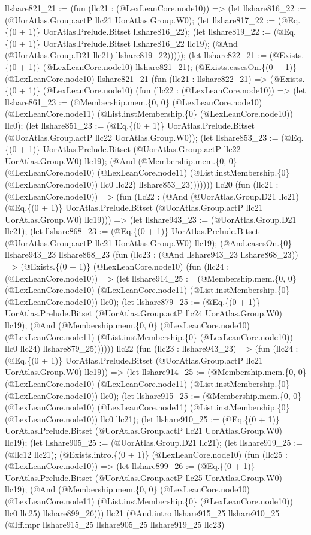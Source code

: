 \documentclass[11pt]{article}
\begin{document}
llshare821\_21 := (fun (llc21 : (@LexLeanCore.node10)) => (let llshare816\_22 := (@UorAtlas.Group.actP llc21 UorAtlas.Group.W0); (let llshare817\_22 := (@Eq.\{(0 + 1)\} UorAtlas.Prelude.Bitset llshare816\_22); (let llshare819\_22 := (@Eq.\{(0 + 1)\} UorAtlas.Prelude.Bitset llshare816\_22 llc19); (@And (@UorAtlas.Group.D21 llc21) llshare819\_22))))); (let llshare822\_21 := (@Exists.\{(0 + 1)\} (@LexLeanCore.node10) llshare821\_21); (@Exists.casesOn.\{(0 + 1)\} (@LexLeanCore.node10) llshare821\_21 (fun (llc21 : llshare822\_21) => (@Exists.\{(0 + 1)\} (@LexLeanCore.node10) (fun (llc22 : (@LexLeanCore.node10)) => (let llshare861\_23 := (@Membership.mem.\{0, 0\} (@LexLeanCore.node10) (@LexLeanCore.node11) (@List.instMembership.\{0\} (@LexLeanCore.node10)) llc0); (let llshare851\_23 := (@Eq.\{(0 + 1)\} UorAtlas.Prelude.Bitset (@UorAtlas.Group.actP llc22 UorAtlas.Group.W0)); (let llshare853\_23 := (@Eq.\{(0 + 1)\} UorAtlas.Prelude.Bitset (@UorAtlas.Group.actP llc22 UorAtlas.Group.W0) llc19); (@And (@Membership.mem.\{0, 0\} (@LexLeanCore.node10) (@LexLeanCore.node11) (@List.instMembership.\{0\} (@LexLeanCore.node10)) llc0 llc22) llshare853\_23))))))) llc20 (fun (llc21 : (@LexLeanCore.node10)) => (fun (llc22 : (@And (@UorAtlas.Group.D21 llc21) (@Eq.\{(0 + 1)\} UorAtlas.Prelude.Bitset (@UorAtlas.Group.actP llc21 UorAtlas.Group.W0) llc19))) => (let llshare943\_23 := (@UorAtlas.Group.D21 llc21); (let llshare868\_23 := (@Eq.\{(0 + 1)\} UorAtlas.Prelude.Bitset (@UorAtlas.Group.actP llc21 UorAtlas.Group.W0) llc19); (@And.casesOn.\{0\} llshare943\_23 llshare868\_23 (fun (llc23 : (@And llshare943\_23 llshare868\_23)) => (@Exists.\{(0 + 1)\} (@LexLeanCore.node10) (fun (llc24 : (@LexLeanCore.node10)) => (let llshare914\_25 := (@Membership.mem.\{0, 0\} (@LexLeanCore.node10) (@LexLeanCore.node11) (@List.instMembership.\{0\} (@LexLeanCore.node10)) llc0); (let llshare879\_25 := (@Eq.\{(0 + 1)\} UorAtlas.Prelude.Bitset (@UorAtlas.Group.actP llc24 UorAtlas.Group.W0) llc19); (@And (@Membership.mem.\{0, 0\} (@LexLeanCore.node10) (@LexLeanCore.node11) (@List.instMembership.\{0\} (@LexLeanCore.node10)) llc0 llc24) llshare879\_25)))))) llc22 (fun (llc23 : llshare943\_23) => (fun (llc24 : (@Eq.\{(0 + 1)\} UorAtlas.Prelude.Bitset (@UorAtlas.Group.actP llc21 UorAtlas.Group.W0) llc19)) => (let llshare914\_25 := (@Membership.mem.\{0, 0\} (@LexLeanCore.node10) (@LexLeanCore.node11) (@List.instMembership.\{0\} (@LexLeanCore.node10)) llc0); (let llshare915\_25 := (@Membership.mem.\{0, 0\} (@LexLeanCore.node10) (@LexLeanCore.node11) (@List.instMembership.\{0\} (@LexLeanCore.node10)) llc0 llc21); (let llshare910\_25 := (@Eq.\{(0 + 1)\} UorAtlas.Prelude.Bitset (@UorAtlas.Group.actP llc21 UorAtlas.Group.W0) llc19); (let llshare905\_25 := (@UorAtlas.Group.D21 llc21); (let llshare919\_25 := (@llc12 llc21); (@Exists.intro.\{(0 + 1)\} (@LexLeanCore.node10) (fun (llc25 : (@LexLeanCore.node10)) => (let llshare899\_26 := (@Eq.\{(0 + 1)\} UorAtlas.Prelude.Bitset (@UorAtlas.Group.actP llc25 UorAtlas.Group.W0) llc19); (@And (@Membership.mem.\{0, 0\} (@LexLeanCore.node10) (@LexLeanCore.node11) (@List.instMembership.\{0\} (@LexLeanCore.node10)) llc0 llc25) llshare899\_26))) llc21 (@And.intro llshare915\_25 llshare910\_25 (@Iff.mpr llshare915\_25 llshare905\_25 llshare919\_25 llc23) 
\end{document}
